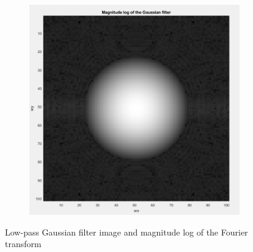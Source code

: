 \begin{figure}[h]
\begin{subfigure}{0.4\textwidth}
        \includegraphics[width=\textwidth]{Resources/F11-b.png}
        \caption{}
        \label{fig:Second}
    \end{subfigure}
    \caption{Low-pass Gaussian filter image and magnitude log of the Fourier transform}
    \label{fig:Fourier transform}
\end{figure}